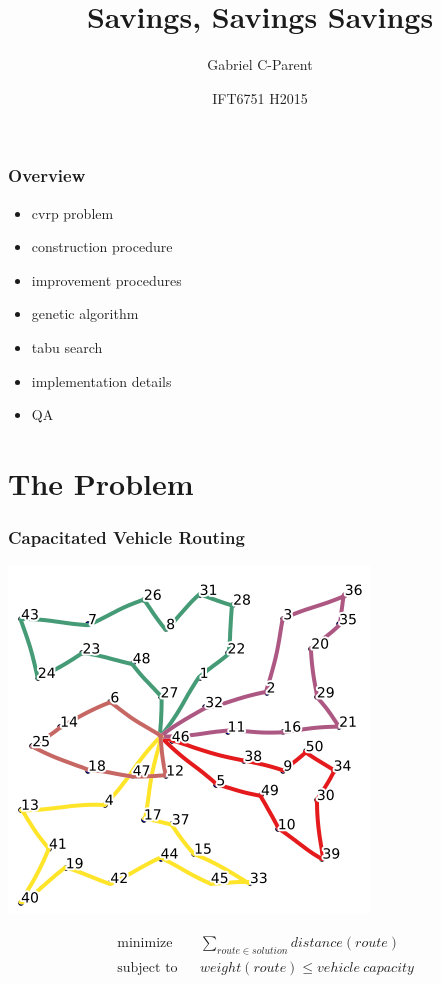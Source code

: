 \documentclass{beamer}
\title{Savings, Savings Savings}
\author{Gabriel C-Parent}
\date{IFT6751 H2015}
\begin{document}
\maketitle

\begin{frame}
\frametitle{Overview}
\begin{itemize}
	\item cvrp problem
	\item construction procedure
	\item improvement procedures
	\item genetic algorithm
	\item tabu search
	\item implementation details
	\item QA
\end{itemize}
\end{frame}


\section{The Problem}

\begin{frame}
\frametitle{Capacitated Vehicle Routing}
\begin{center}

\includegraphics[scale=0.37]{figs/cvrp}


\begin{equation*}
\begin{aligned}
& \text{minimize}
& & \sum\limits_{route \in solution} distance(route) \\
& \text{subject to}
& & weight(route) \leq vehicle\ capacity
\end{aligned}
\end{equation*}

\end{center}
\end{frame}
\end{document}
